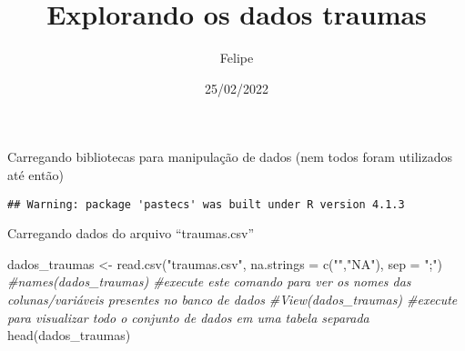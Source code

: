 \documentclass[
]{article}
\title{Explorando os dados traumas}
\author{Felipe}
\date{25/02/2022}
\newenvironment{Shaded}{\begin{snugshade}}{\end{snugshade}}
\newcommand{\AttributeTok}[1]{\textcolor[rgb]{0.77,0.63,0.00}{#1}}
\newcommand{\CommentTok}[1]{\textcolor[rgb]{0.56,0.35,0.01}{\textit{#1}}}
\newcommand{\FunctionTok}[1]{\textcolor[rgb]{0.00,0.00,0.00}{#1}}
\newcommand{\NormalTok}[1]{#1}
\newcommand{\OtherTok}[1]{\textcolor[rgb]{0.56,0.35,0.01}{#1}}
\newcommand{\StringTok}[1]{\textcolor[rgb]{0.31,0.60,0.02}{#1}}
\begin{document}
\maketitle

Carregando bibliotecas para manipulação de dados (nem todos foram
utilizados até então)

\begin{verbatim}
## Warning: package 'pastecs' was built under R version 4.1.3
\end{verbatim}

Carregando dados do arquivo ``traumas.csv''

\begin{Shaded}
\begin{Highlighting}[]
\NormalTok{dados\_traumas }\OtherTok{\textless{}{-}} \FunctionTok{read.csv}\NormalTok{(}\StringTok{"traumas.csv"}\NormalTok{, }\AttributeTok{na.strings =} \FunctionTok{c}\NormalTok{(}\StringTok{""}\NormalTok{,}\StringTok{"NA"}\NormalTok{), }\AttributeTok{sep =} \StringTok{";"}\NormalTok{) }
\CommentTok{\#names(dados\_traumas) \#execute este comando para ver os nomes das colunas/variáveis presentes no banco de dados}
\CommentTok{\#View(dados\_traumas) \#execute para visualizar todo o conjunto de dados em uma tabela separada}
\FunctionTok{head}\NormalTok{(dados\_traumas) }
\end{Highlighting}
\end{Shaded}
\end{document}
